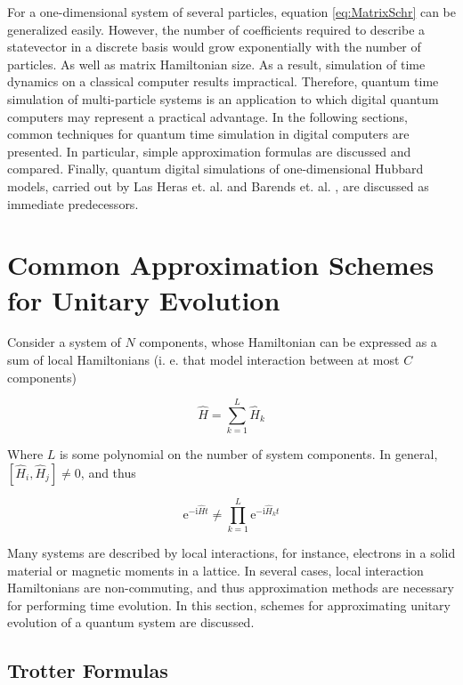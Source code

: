   For a one-dimensional system of several particles, equation \ref{eq:MatrixSchr} can be generalized easily. However, the number of coefficients required to describe a statevector in a discrete basis would grow exponentially with the number of particles. As well as matrix Hamiltonian size. As a result, simulation of time dynamics on a classical computer results impractical. Therefore, quantum time simulation of multi-particle systems is an application to which digital quantum computers may represent a practical advantage. In the following sections, common techniques for quantum time simulation in digital computers are presented. In particular, simple approximation formulas are discussed and compared. Finally, quantum digital simulations of one-dimensional Hubbard models, carried out by Las Heras et. al. \cite{HubbardSimulLasHeras} and Barends et. al. \cite{HubbardSimul}, are discussed as immediate predecessors.


\section{Common Approximation Schemes for Unitary Evolution}
  Consider a system of $N$ components, whose Hamiltonian can be expressed as a sum of local Hamiltonians (i. e. that model interaction between at most $C$ components) \cite{Nielsen,LloydNature}

  \begin{equation}
    \hat{H} = \sum_{k = 1}^{L} \hat{H}_k
    \label{eq:SparseHam}
  \end{equation}

  Where $L$ is some polynomial on the number of system components. In general, $[\hat{H}_i,\hat{H}_j] \neq 0$, and thus

  \begin{equation}
    \mathrm{e}^{-\mathrm{i}\hat{H}t} \neq \prod_{k = 1}^{L} \mathrm{e}^{-\mathrm{i}\hat{H}_kt}
    \label{eq:CommuteUnit}
  \end{equation}

  Many systems are described by local interactions, for instance, electrons in a solid material or magnetic moments in a lattice. In several cases, local interaction Hamiltonians are non-commuting, and thus approximation methods are necessary for performing time evolution. In this section, schemes for approximating unitary evolution of a quantum system are discussed.

  \subsection{Trotter Formulas}

